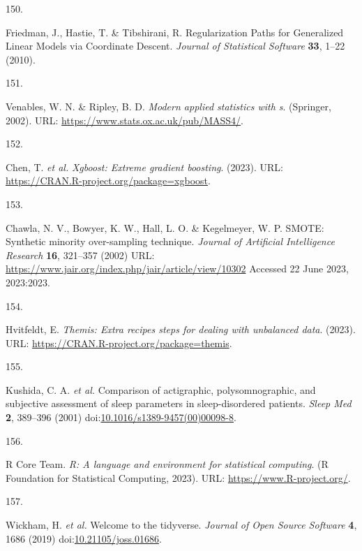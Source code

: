 \documentclass[
  10pt,
]{scrbook}
\newlength{\cslhangindent}
\newlength{\csllabelwidth}
\newlength{\cslentryspacingunit} %
\newenvironment{CSLReferences}[2] %
 {%
  \setlength{\parindent}{0pt}
  \ifodd #1
  \let\oldpar\par
  \def\par{\hangindent=\cslhangindent\oldpar}
  \fi
  \setlength{\parskip}{#2\cslentryspacingunit}
 }%
 {}
\newcommand{\CSLLeftMargin}[1]{\parbox[t]{\csllabelwidth}{#1}}
\newcommand{\CSLRightInline}[1]{\parbox[t]{\linewidth - \csllabelwidth}{#1}\break}
\let\originaltextbf\textbf
\renewcommand{\textbf}[1]{\textcolor{color1}{\originaltextbf{#1}}}
\begin{document}
\begin{CSLReferences}{0}{0}
\leavevmode{}%
\CSLLeftMargin{150. }%
\CSLRightInline{Friedman, J., Hastie, T. \& Tibshirani, R.
Regularization Paths for Generalized Linear Models via Coordinate
Descent. \emph{Journal of Statistical Software} \textbf{33}, 1--22
(2010).}

\leavevmode{}%
\CSLLeftMargin{151. }%
\CSLRightInline{Venables, W. N. \& Ripley, B. D. \emph{Modern applied
statistics with s}. (Springer, 2002). URL:
\url{https://www.stats.ox.ac.uk/pub/MASS4/}.}

\leavevmode{}%
\CSLLeftMargin{152. }%
\CSLRightInline{Chen, T. \emph{et al.} \emph{Xgboost: Extreme gradient
boosting}. (2023). URL:
\url{https://CRAN.R-project.org/package=xgboost}.}

\leavevmode{}%
\CSLLeftMargin{153. }%
\CSLRightInline{Chawla, N. V., Bowyer, K. W., Hall, L. O. \& Kegelmeyer,
W. P. {SMOTE}: Synthetic minority over-sampling technique. \emph{Journal
of Artificial Intelligence Research} \textbf{16}, 321--357 (2002) URL:
\url{https://www.jair.org/index.php/jair/article/view/10302} Accessed 22
June 2023, 2023:2023.}

\leavevmode{}%
\CSLLeftMargin{154. }%
\CSLRightInline{Hvitfeldt, E. \emph{Themis: Extra recipes steps for
dealing with unbalanced data}. (2023). URL:
\url{https://CRAN.R-project.org/package=themis}.}

\leavevmode{}%
\CSLLeftMargin{155. }%
\CSLRightInline{Kushida, C. A. \emph{et al.} Comparison of actigraphic,
polysomnographic, and subjective assessment of sleep parameters in
sleep-disordered patients. \emph{Sleep Med} \textbf{2}, 389--396 (2001)
doi:\href{https://doi.org/10.1016/s1389-9457(00)00098-8}{10.1016/s1389-9457(00)00098-8}.}

\leavevmode{}%
\CSLLeftMargin{156. }%
\CSLRightInline{R Core Team. \emph{R: A language and environment for
statistical computing}. (R Foundation for Statistical Computing, 2023).
URL: \url{https://www.R-project.org/}.}

\leavevmode{}%
\CSLLeftMargin{157. }%
\CSLRightInline{Wickham, H. \emph{et al.} Welcome to the tidyverse.
\emph{Journal of Open Source Software} \textbf{4}, 1686 (2019)
doi:\href{https://doi.org/10.21105/joss.01686}{10.21105/joss.01686}.}


\end{CSLReferences}
\end{document}
